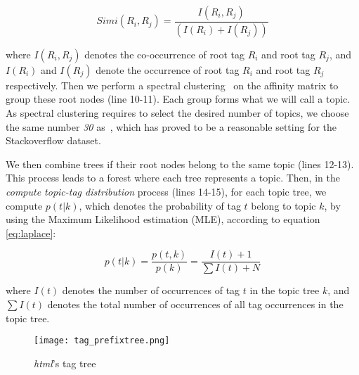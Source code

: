 \begin{equation}
Simi(R_i,R_j)= \frac{I(R_i,R_j)}{(I(R_i)+I(R_j))}
\label{eq:simi}
\end{equation}

where $I(R_i,R_j)$ denotes the co-occurrence of root tag $R_i$ and root tag $R_j$, and $I(R_i)$ and $I(R_j)$ denote the occurrence of root tag $R_i$ and root tag $R_j$ respectively. Then we perform a spectral clustering~\cite{Ng01onspectral} on the affinity matrix to group these root nodes  (line 10-11). Each group forms what we will call a topic. As spectral clustering requires to select the desired number of topics, we choose the same number \textit{30} as~\cite{Chang:2013}, which has proved to be a reasonable setting for the Stackoverflow dataset.

We then combine trees if their root nodes belong to the same topic (lines 12-13). This process leads to a forest where each tree represents a topic. Then, in the \textit{compute topic-tag distribution} process (lines 14-15), for each topic tree, we compute $p(t|k)$, which denotes the probability of tag $t$ belong to topic $k$, by using the Maximum Likelihood estimation (MLE), according to equation \ref{eq:laplace}: 


\begin{equation}
p(t|k) = \frac{p(t,k)}{p(k)} = \frac{I(t)+1}{\sum I(t)+N}
\label{eq:laplace}
\end{equation}


where $I(t)$ denotes the number of occurrences of tag $t$ in the topic tree $k$, and $\sum I(t)$ denotes the total number of occurrences of all tag occurrences in the topic tree.

\begin{figure}[!htp]
\centering
\texttt{[image: tag\_prefixtree.png]}  
\caption{\textit{html}'s tag tree}
\label{fig:htmltagtree} 
\end{figure}


